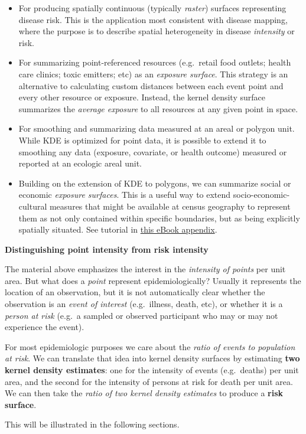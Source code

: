 \documentclass[
]{book}
\providecommand{\tightlist}{%
  \setlength{\itemsep}{0pt}\setlength{\parskip}{0pt}}
\newenvironment{rmdcaution}[1]
  {
  \begin{itemize}
  \renewcommand{\labelitemi}{
    \raisebox{-.7\height}[0pt][0pt]{
      {\setkeys{Gin}{width=3em,keepaspectratio}\texttt{[image: images/\#1]}}
    }
  }
  \setlength{\fboxsep}{1em}
  \begin{caution}
  \item
  }
  {
  \end{caution}
  \end{itemize}
  }
\begin{document}
\begin{itemize}
\tightlist
\item
  For producing spatially continuous (typically \emph{raster}) surfaces representing disease risk. This is the application most consistent with disease mapping, where the purpose is to describe spatial heterogeneity in disease \emph{intensity} or risk.
\item
  For summarizing point-referenced resources (e.g.~retail food outlets; health care clinics; toxic emitters; etc) as an \emph{exposure surface}. This strategy is an alternative to calculating custom distances between each event point and every other resource or exposure. Instead, the kernel density surface summarizes the \emph{average exposure} to all resources at any given point in space.
\item
  For smoothing and summarizing data measured at an areal or polygon unit. While KDE is optimized for point data, it is possible to extend it to smoothing any data (exposure, covariate, or health outcome) measured or reported at an ecologic areal unit.
\item
  Building on the extension of KDE to polygons, we can summarize social or economic \emph{exposure surfaces}. This is a useful way to extend socio-economic-cultural measures that might be available at census geography to represent them as not only contained within specific boundaries, but as being explicitly spatially situated. See tutorial in \protect\hyperlink{kde-extract}{this eBook appendix}.
\end{itemize}

\begin{rmdcaution}{caution}
\textbf{Distinguishing point intensity from risk intensity}

The material above emphasizes the interest in the \emph{intensity of points} per unit area. But what does a \emph{point} represent epidemiologically? Usually it represents the location of an observation, but it is not automatically clear whether the observation is an \emph{event of interest} (e.g.~illness, death, etc), or whether it is a \emph{person at risk} (e.g.~a sampled or observed participant who may or may not experience the event).

For most epidemiologic purposes we care about the \emph{ratio of events to population at risk}. We can translate that idea into kernel density surfaces by estimating \textbf{two kernel density estimates}: one for the intensity of events (e.g.~deaths) per unit area, and the second for the intensity of persons at risk for death per unit area. We can then take the \emph{ratio of two kernel density estimates} to produce a \textbf{risk surface}.

This will be illustrated in the following sections.

\end{rmdcaution}
\end{document}
